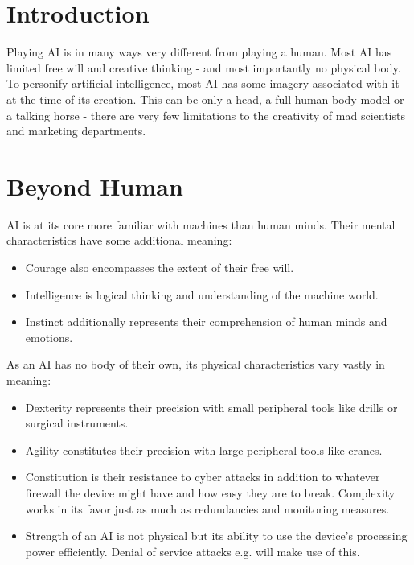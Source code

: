 \documentclass[12pt,a4paper,openany]{book}
\begin{document}
	

	\chapter{Introduction}
	Playing AI is in many ways very different from playing a human. Most AI has limited free will and creative thinking - and most importantly no physical body. To personify artificial intelligence, most AI has some imagery associated with it at the time of its creation. This can be only a head, a full human body model or a talking horse - there are very few limitations to the creativity of mad scientists and marketing departments.

	\chapter{Beyond Human}
	\vspace{-8mm} %
	AI is at its core more familiar with machines than human minds. Their mental characteristics have some additional meaning:
	\vspace{-8mm}
	\begin{itemize}
		\setlength\itemsep{-8mm}
		\item Courage also encompasses the extent of their free will.
		\item Intelligence is logical thinking and understanding of the machine world.
		\item Instinct additionally represents their comprehension of human minds and emotions.
	\end{itemize}

	As an AI has no body of their own, its physical characteristics vary vastly in meaning:
	\vspace{-8mm}
	\begin{itemize}
		\setlength\itemsep{-8mm}
		\item Dexterity represents their precision with small peripheral tools like drills or surgical instruments.
		\item Agility constitutes their precision with large peripheral tools like cranes.
		\item Constitution is their resistance to cyber attacks in addition to whatever firewall the device might have and how easy they are to break. Complexity works in its favor just as much as redundancies and monitoring measures.
		\item Strength of an AI is not physical but its ability to use the device’s processing power efficiently. Denial of service attacks e.g. will make use of this.
	\end{itemize}
\end{document}

